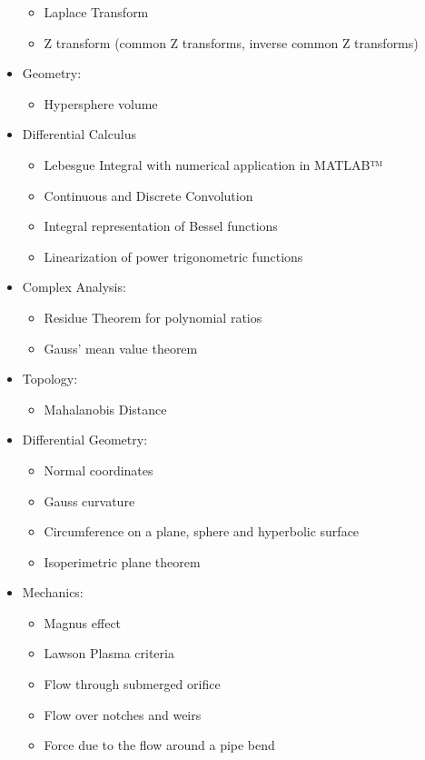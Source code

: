 \begin{itemize}
\begin{itemize}
				\item Laplace Transform
				\item Z transform (common Z transforms, inverse common Z transforms)
			\end{itemize}
		\item Geometry:
			\begin{itemize}
				\item Hypersphere volume
			\end{itemize}
		\item Differential Calculus
			\begin{itemize}
				\item Lebesgue Integral with numerical application in MATLAB™
				\item Continuous and Discrete Convolution
				\item Integral representation of Bessel functions
				\item Linearization of power trigonometric functions
			\end{itemize}
		\item Complex Analysis: 
			\begin{itemize}
				\item Residue Theorem for polynomial ratios
				\item Gauss' mean value theorem
			\end{itemize}
		\item Topology: 
			\begin{itemize}
				\item Mahalanobis Distance
			\end{itemize}			
		\item Differential Geometry: 
			\begin{itemize}
				\item Normal coordinates
				\item Gauss curvature
				\item Circumference on a plane, sphere and hyperbolic surface
				\item Isoperimetric plane theorem
			\end{itemize}
		\item Mechanics: 
			\begin{itemize}
				\item Magnus effect
				\item Lawson Plasma criteria
				\item Flow through submerged orifice
				\item Flow over notches and weirs
				\item Force due to the flow around a pipe bend

\end{itemize}
\end{itemize}
